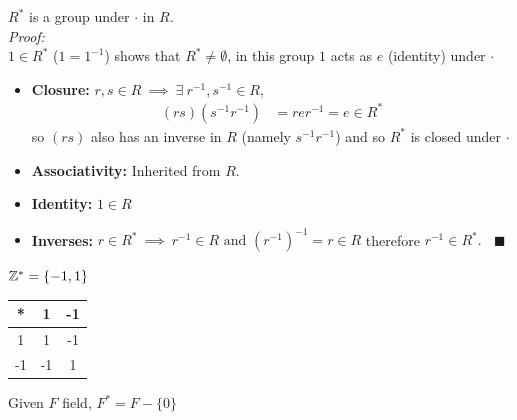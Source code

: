 \begin{proposition}
    $R^*$ is a group under $\cdot$ in $R$. \\

    \noindent \textit{Proof:} \\
    \indent $1\in R^*$  ($1=1^{-1}$) shows that $R^* \neq \emptyset$, in this group $1$ acts as $e$
    (identity) under $\cdot$
    \begin{itemize}
        \item \textbf{Closure:} $r,s \in R \ \implies \ \exists \ r^{-1},s^{-1} \in R$,
        \begin{align}
            (rs)(s^{-1}r^{-1})&= rer^{-1}=e \in R^* \nonumber
        \end{align}
        so $(rs)$ also has an inverse in $R$ (namely $s^{-1}r^{-1}$) and so $R^*$ is closed under
        $\cdot$
        \item \textbf{Associativity:} Inherited from $R$.
        \item \textbf{Identity:} $1\in R$
        \item \textbf{Inverses:}
        $r\in R^* \ \implies \ r^{-1} \in R \text{ and } (r^{-1})^{-1}=r\in R$ therefore
        $r^{-1}\in R^*. \ \ \ \ \blacksquare$
    \end{itemize}
\end{proposition}


\begin{example}
    ${\mathbb{Z}}^{*}= \{-1,1\}$ \\ \steezybreak

    \begin{tabular}{|c|c|c|}
        *&1&-1 \\ \hline
        1&1&-1 \\ \hline
        -1&-1&1
    \end{tabular}
\end{example}

\begin{example} 
    Given $F$ field, $F^*=F-\{0\}$
\end{example}

